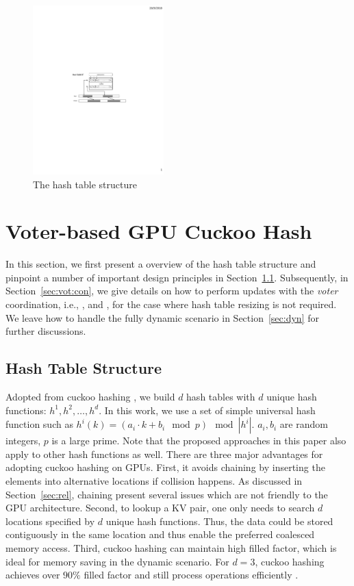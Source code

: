 
\begin{figure}[t]
	\centering
	\includegraphics[width=0.45\textwidth]{fig/Hashtable.pdf}
	\caption{The hash table structure}
	\label{fig:hashtable}
\end{figure}

\section{Voter-based GPU Cuckoo Hash}\label{sec:vot}
In this section, we first present a overview of the hash table structure and pinpoint a number of important design principles in Section~\ref{sec:vot:has}.
Subsequently, in Section~\ref{sec:vot:con}, we give details on how to perform updates with the \emph{voter} coordination, i.e., ,  and , for the case where hash table resizing is not required. 
We leave how to handle the fully dynamic scenario in Section~\ref{sec:dyn} for further discussions. 

\subsection{Hash Table Structure}\label{sec:vot:has}
Adopted from cuckoo hashing \cite{pagh2004cuckoo}, we build $d$ hash tables with $d$ unique hash functions: $h^1,h^2,\ldots,h^d$. 
In this work, we use a set of simple universal hash function such as $h^i(k) = (a_i\cdot k + b_i \mod p) \mod |h^i|$.
$a_i,b_i$ are random integers, $p$ is a large prime.
Note that the proposed approaches in this paper also apply to other hash functions as well. 
There are three major advantages for adopting cuckoo hashing on GPUs. 
First, it avoids chaining by inserting the elements into alternative locations if collision happens. As discussed in Section~\ref{sec:rel}, 
chaining present several issues which are not friendly to the GPU architecture.  
Second, to lookup a KV pair, one only needs to search $d$ locations specified by $d$ unique hash functions. 
Thus, the data could be stored contiguously in the same location and thus enable the preferred coalesced memory access. 
Third, cuckoo hashing can maintain high filled factor, which is ideal for memory saving in the dynamic scenario. 
For $d=3$, cuckoo hashing achieves over $90\%$ filled factor and still process  operations efficiently \cite{fotakis2005space}.

